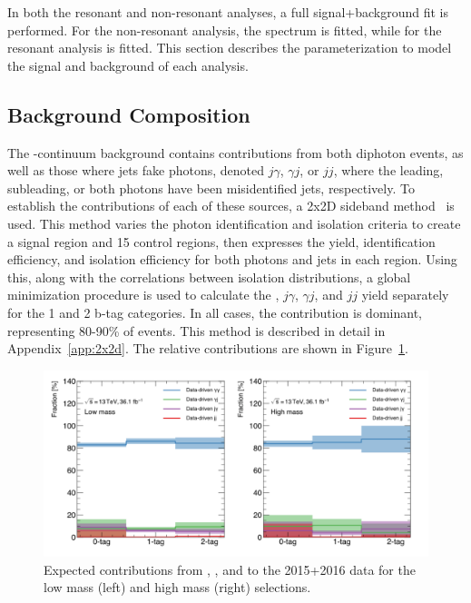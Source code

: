 In both the resonant and non-resonant analyses, a full signal+background fit is performed. For the non-resonant analysis, the \myy spectrum is fitted, while for the resonant analysis \myybb is fitted. This section describes the parameterization to model the signal and background of each analysis.

\subsection{Background Composition}\label{ssec:background-composition}

The \yy-continuum background contains contributions from both diphoton events, as well as those where jets fake photons, denoted $j\gamma$, $\gamma j$, or $jj$, where the leading, subleading, or both photons have been misidentified jets, respectively. To establish the contributions of each of these sources, a 2x2D sideband method~\cite{2x2d-sideband} is used. This method varies the photon identification and isolation criteria to create a signal region and 15 control regions, then expresses the yield, identification efficiency, and isolation efficiency for both photons and jets in each region. Using this, along with the correlations between isolation distributions, a global minimization procedure is used to calculate the \yy, $j\gamma$, $\gamma j$, and $jj$ yield separately for the 1 and 2 b-tag categories. In all cases, the \yy contribution is dominant, representing 80-90\% of events. This method is described in detail in Appendix~\ref{app:2x2d}. The relative contributions are shown in Figure~\ref{fig:background_fractions}.


\begin{figure}[!htb]
  \centering
  \includegraphics[width=\textwidth]{chapters/chapter5_yybb/images/2x2d/expected_contribution_clean.pdf}
  \caption[Expected contributions from \yy, \yj, \jy and \jj to the 2015+2016 data for the low and high mass selections]{Expected contributions from \yy, \yj, \jy and \jj to the 2015+2016 data for the low mass (left) and high mass (right) selections.
    \label{fig:background_fractions}}
\end{figure}


